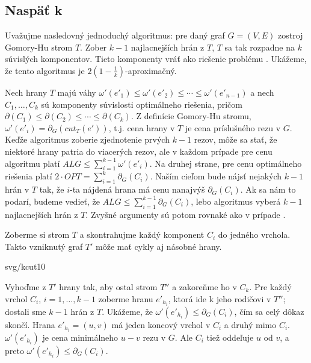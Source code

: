 \subsection*{Naspäť k \kcut}

Uvažujme nasledovný jednoduchý algoritmus: pre daný graf $G=(V,E)$ zostroj Gomory-Hu strom $T$.
Zober $k-1$ najlacnejších hrán z $T$, $T$ sa tak rozpadne na $k$ súvislých komponentov. Tieto
komponenty vráť ako riešenie problému \kcut.
Ukážeme, že tento algoritmus je $2\left(1-\frac{1}{k}\right)$-aproximačný.

Nech hrany $T$ majú váhy $\omega'(e'_1)\le\omega'(e'_2)\le\cdots\le\omega'(e'_{n-1})$ a nech
$C_1,\ldots,C_k$ sú komponenty súvislosti optimálneho riešenia, pričom 
$\partial(C_1)\le\partial(C_2)\le\cdots\le\partial(C_k)$.
Z definície Gomory-Hu stromu, $\omega'(e'_i)=\partial_G(cut_T(e'))$, t.j. cena hrany v $T$ je cena
príslušného rezu v $G$. Keďže
algoritmus zoberie zjednotenie prvých $k-1$ rezov, môže sa stať, že niektoré hrany patria do viacerých
rezov, ale v každom prípade pre cenu algoritmu platí $ALG\le\sum_{i=1}^{k-1}\omega'(e'_i)$.
Na druhej strane, pre cenu optimálneho riešenia platí $2\cdot OPT=\sum_{i=1}^k\partial_G(C_i)$. Naším 
cieľom bude nájsť nejakých $k-1$ hrán v $T$ tak, že $i$-ta nájdená hrana má cenu nanajvýš $\partial_G(C_i)$.
Ak sa nám to podarí, budeme vedieť, že $ALG\le\sum_{i=1}^{k-1}\partial_G(C_i)$, lebo algoritmus
vyberá $k-1$ najlacnejších hrán z $T$. Zvyšné argumenty sú potom rovnaké ako v prípade \multiwaycut.

Zoberme si strom $T$ a skontrahujme každý komponent $C_i$ do jedného vrchola. Takto vzniknutý graf $T'$ môže mať 
cykly aj násobné hrany.

\begin{myfig}{0.9\textwidth}{svg/kcut10}
\end{myfig}

Vyhoďme z $T'$  hrany tak, aby ostal strom $T''$  a zakoreňme ho v $C_k$.
Pre každý vrchol $C_i$, $i=1,\ldots,k-1$ zoberme hranu $e'_{h_i}$, 
ktorá ide k jeho rodičovi v $T''$; dostali sme $k-1$ hrán z $T$. Ukážeme, že $\omega'(e'_{h_i})\le\partial_G(C_i)$,
čím sa celý dôkaz skončí.
Hrana $e'_{h_i}=(u,v)$ má jeden koncový vrchol v $C_i$ a druhý mimo $C_i$. $\omega'(e'_{h_i})$ je cena
minimálneho $u-v$ rezu v $G$. Ale $C_i$ tiež oddeľuje $u$ od $v$, a preto $\omega'(e'_{h_i})\le\partial_G(C_i)$.


